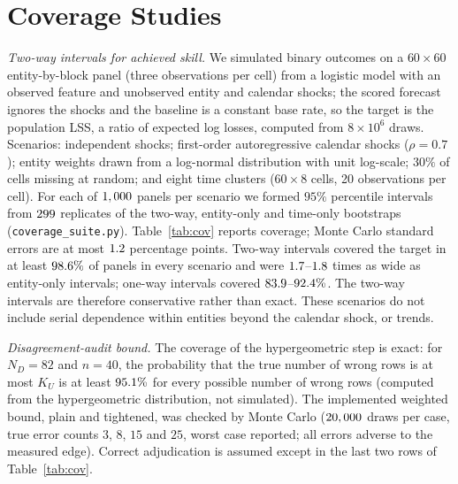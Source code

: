 \section{Coverage Studies}\label{app:coverage}
\emph{Two-way intervals for achieved skill.} We simulated binary outcomes on a $60\times60$ entity-by-block panel (three observations per cell) from a logistic model with an observed feature and unobserved entity and calendar shocks; the scored forecast ignores the shocks and the baseline is a constant base rate, so the target is the population LSS, a ratio of expected log losses, computed from $8\times10^6$ draws. Scenarios: independent shocks; first-order autoregressive calendar shocks ($\rho=0.7$); entity weights drawn from a log-normal distribution with unit log-scale; $30\%$ of cells missing at random; and eight time clusters ($60\times8$ cells, 20 observations per cell). For each of $1,000$ panels per scenario we formed $95\%$ percentile intervals from $299$ replicates of the two-way, entity-only and time-only bootstraps (\texttt{coverage\_suite.py}). Table~\ref{tab:cov} reports coverage; Monte Carlo standard errors are at most $1.2$ percentage points. Two-way intervals covered the target in at least $98.6\%$ of panels in every scenario and were $1.7$--$1.8$ times as wide as entity-only intervals; one-way intervals covered $83.9$--$92.4\%$. The two-way intervals are therefore conservative rather than exact. These scenarios do not include serial dependence within entities beyond the calendar shock, or trends.

\emph{Disagreement-audit bound.} The coverage of the hypergeometric step is exact: for $N_D=82$ and $n=40$, the probability that the true number of wrong rows is at most $K_U$ is at least $95.1\%$ for every possible number of wrong rows (computed from the hypergeometric distribution, not simulated). The implemented weighted bound, plain and tightened, was checked by Monte Carlo ($20,000$ draws per case, true error counts $3$, $8$, $15$ and $25$, worst case reported; all errors adverse to the measured edge). Correct adjudication is assumed except in the last two rows of Table~\ref{tab:cov}.

